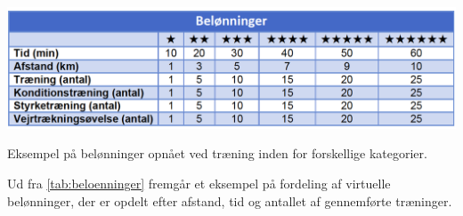 \begin{table} [H]
\centering
\includegraphics[width=1\textwidth]{figures/aktivitetsdiagram/beloenninger}
\caption{Eksempel på belønninger opnået ved træning inden for forskellige kategorier.}
\label{tab:beloenninger}
\end{table}

\noindent
Ud fra \autoref{tab:beloenninger} fremgår et eksempel på fordeling af virtuelle belønninger, der er opdelt efter afstand, tid og antallet af gennemførte træninger. 